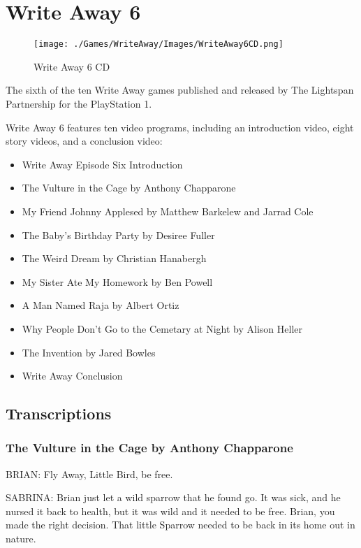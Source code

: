 \chapter{Write Away 6}

\begin{figure}[H]
    \centering
    \texttt{[image: ./Games/WriteAway/Images/WriteAway6CD.png]}
    \caption{Write Away 6 CD}
\end{figure}

The sixth of the ten Write Away games published and released by The Lightspan Partnership for the PlayStation 1.

Write Away 6 features ten video programs, including an introduction video, eight story videos, and a conclusion video:

\begin{itemize}
    \item Write Away Episode Six Introduction
    \item The Vulture in the Cage by Anthony Chapparone
    \item My Friend Johnny Applesed by Matthew Barkelew and Jarrad Cole
    \item The Baby's Birthday Party by Desiree Fuller
    \item The Weird Dream by Christian Hanabergh
    \item My Sister Ate My Homework by Ben Powell
    \item A Man Named Raja by Albert Ortiz
    \item Why People Don't Go to the Cemetary at Night by Alison Heller
    \item The Invention by Jared Bowles
    \item Write Away Conclusion
\end{itemize}

\clearpage
\newpage

\section{Transcriptions}

\subsection{The Vulture in the Cage by Anthony Chapparone}

BRIAN:
Fly Away, Little Bird, be free.

SABRINA:
Brian just let a wild sparrow that he found go.
It was sick, and he nursed it back to health, but it was wild and it needed to be free.
Brian, you made the right decision.
That little Sparrow needed to be back in its home out in nature.

